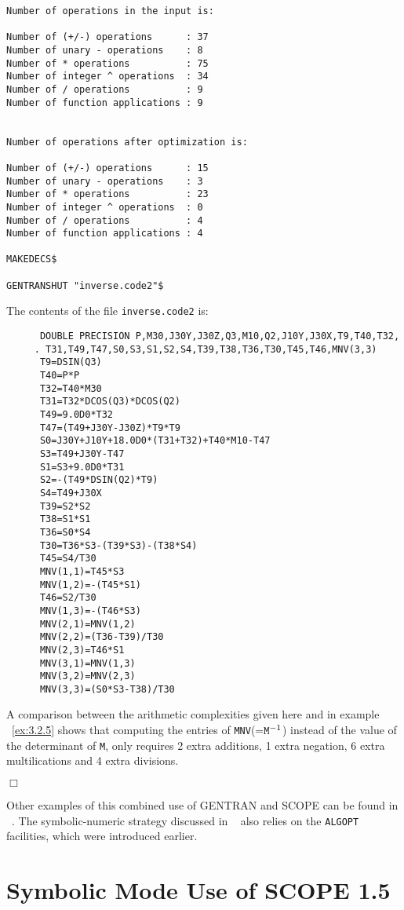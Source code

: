 {{\begin{verbatim}
Number of operations in the input is:

Number of (+/-) operations      : 37
Number of unary - operations    : 8
Number of * operations          : 75
Number of integer ^ operations  : 34
Number of / operations          : 9
Number of function applications : 9


Number of operations after optimization is:

Number of (+/-) operations      : 15
Number of unary - operations    : 3
Number of * operations          : 23
Number of integer ^ operations  : 0
Number of / operations          : 4
Number of function applications : 4

MAKEDECS$

GENTRANSHUT "inverse.code2"$
\end{verbatim}}

The contents of the file {\tt inverse.code2} is:
{\small
\begin{verbatim}
      DOUBLE PRECISION P,M30,J30Y,J30Z,Q3,M10,Q2,J10Y,J30X,T9,T40,T32,
     . T31,T49,T47,S0,S3,S1,S2,S4,T39,T38,T36,T30,T45,T46,MNV(3,3)
      T9=DSIN(Q3)
      T40=P*P
      T32=T40*M30
      T31=T32*DCOS(Q3)*DCOS(Q2)
      T49=9.0D0*T32
      T47=(T49+J30Y-J30Z)*T9*T9
      S0=J30Y+J10Y+18.0D0*(T31+T32)+T40*M10-T47
      S3=T49+J30Y-T47
      S1=S3+9.0D0*T31
      S2=-(T49*DSIN(Q2)*T9)
      S4=T49+J30X
      T39=S2*S2
      T38=S1*S1
      T36=S0*S4
      T30=T36*S3-(T39*S3)-(T38*S4)
      T45=S4/T30
      MNV(1,1)=T45*S3
      MNV(1,2)=-(T45*S1)
      T46=S2/T30
      MNV(1,3)=-(T46*S3)
      MNV(2,1)=MNV(1,2)
      MNV(2,2)=(T36-T39)/T30
      MNV(2,3)=T46*S1
      MNV(3,1)=MNV(1,3)
      MNV(3,2)=MNV(2,3)
      MNV(3,3)=(S0*S3-T38)/T30
\end{verbatim}}

A comparison between the arithmetic complexities given here and in example
~\ref{ex:3.2.5} shows that computing the entries of {\tt MNV}(=${\tt M}^{-1}$)
instead of the value of the determinant of {\tt M}, only requires 2
extra additions, 1 extra negation, 6 extra multilications and 4 extra
divisions.
{\small
\begin{flushright}
$\Box$
\end{flushright}}

Other examples of this combined use of GENTRAN and SCOPE can be found
in ~\cite{vanHulzen:95,Ganzha:94}. The symbolic-numeric strategy discussed in
~\cite{Ganzha:94} also relies on the {\tt ALGOPT} facilities, which were
introduced earlier.
\newpage
\section{Symbolic Mode Use of SCOPE 1.5}~\label{SCOPE:symb}

}
